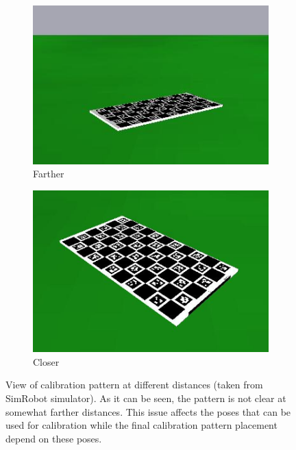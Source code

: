 \documentclass[english, printversion, nomenclature, notitle]{tuvisionthesis} %
\begin{document}
\begin{figure}[h]
	\begin{subfigure}{0.49\columnwidth}
	\centering
	\includegraphics[width=\columnwidth]{figures/calib_pattern_from_nao_top.png}
		\caption{Farther}
	\end{subfigure}
	\begin{subfigure}{0.49\columnwidth}
		\centering
		\includegraphics[width=\columnwidth]{figures/calib_pattern_from_nao.png}
		\caption{Closer}
	\end{subfigure}
	\caption[View of calibration pattern at varying distances.]{View of calibration pattern at different distances (taken from SimRobot simulator). As it can be seen, the pattern is not clear at somewhat farther distances. This issue affects the poses that can be used for calibration while the final calibration pattern placement depend on these poses.}
	\label{fig:nao_see_pattern_top}
\end{figure}
\end{document}
